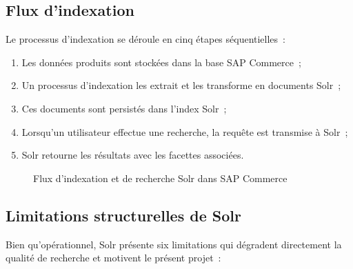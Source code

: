 \subsection{Flux d'indexation}
Le processus d'indexation se déroule en cinq étapes séquentielles~:
\begin{enumerate}
  \item Les données produits sont stockées dans la base SAP Commerce~;
  \item Un processus d'indexation les extrait et les transforme en documents Solr~;
  \item Ces documents sont persistés dans l'index Solr~;
  \item Lorsqu'un utilisateur effectue une recherche, la requête est transmise à Solr~;
  \item Solr retourne les résultats avec les facettes associées.
\end{enumerate}

\begin{figure}[H]
  \centering
  \caption{Flux d'indexation et de recherche Solr dans SAP Commerce}
  \label{fig:solr-flux}
\end{figure}

\subsection{Limitations structurelles de Solr}
Bien qu'opérationnel, Solr présente six limitations qui dégradent directement la qualité de recherche et motivent le présent projet~:

